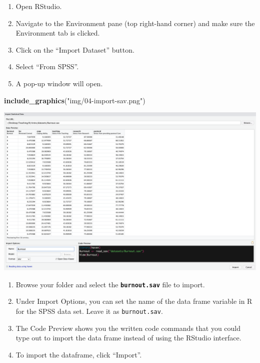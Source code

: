 \documentclass[
]{book}
\newenvironment{Shaded}{\begin{snugshade}}{\end{snugshade}}
\newcommand{\FunctionTok}[1]{\textcolor[rgb]{0.13,0.29,0.53}{\textbf{#1}}}
\newcommand{\NormalTok}[1]{#1}
\newcommand{\StringTok}[1]{\textcolor[rgb]{0.31,0.60,0.02}{#1}}
\begin{document}
\begin{enumerate}
\def\labelenumi{\arabic{enumi}.}
\item
  Open RStudio.
\item
  Navigate to the Environment pane (top right-hand corner) and make sure the Environment tab is clicked.
\item
  Click on the ``Import Dataset'' button.
\item
  Select ``From SPSS''.
\item
  A pop-up window will open.
\end{enumerate}

\begin{Shaded}
\begin{Highlighting}[]
\FunctionTok{include\_graphics}\NormalTok{(}\StringTok{"img/04{-}import{-}sav.png"}\NormalTok{)}
\end{Highlighting}
\end{Shaded}

\includegraphics{img/04-import-sav.png}

\begin{enumerate}
\def\labelenumi{\arabic{enumi}.}
\setcounter{enumi}{5}
\item
  Browse your folder and select the \textbf{\texttt{burnout.sav}} file to import.
\item
  Under Import Options, you can set the name of the data frame variable in R for the SPSS data set. Leave it as \texttt{burnout.sav}.
\item
  The Code Preview shows you the written code commands that you could type out to import the data frame instead of using the RStudio interface.
\item
  To import the dataframe, click ``Import''.
\end{enumerate}
\end{document}
